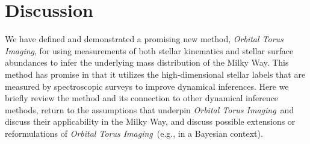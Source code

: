 \documentclass[modern]{aastex63}
\newcommand{\methodname}{\textsl{Orbital Torus Imaging}}
\newcommand{\mdisk}{\ensuremath{\mathrm{M}_\mathrm{disk}}}
\newcommand{\mratio}{\ensuremath{\mdisk / \mdisk^\star}}
\begin{document}




\section{Discussion}
\label{sec:discussion}

We have defined and demonstrated a promising new method, \methodname, for using
measurements of both stellar kinematics and stellar surface abundances to infer
the underlying mass distribution of the Milky Way.
This method has promise in that it utilizes the high-dimensional stellar labels
that are measured by spectroscopic surveys to improve dynamical inferences.
Here we briefly review the method and its connection to other dynamical
inference methods, return to the assumptions that underpin \methodname\ and
discuss their applicability in the Milky Way, and discuss possible extensions or
reformulations of \methodname\ (e.g., in a Bayesian context).
\end{document}
